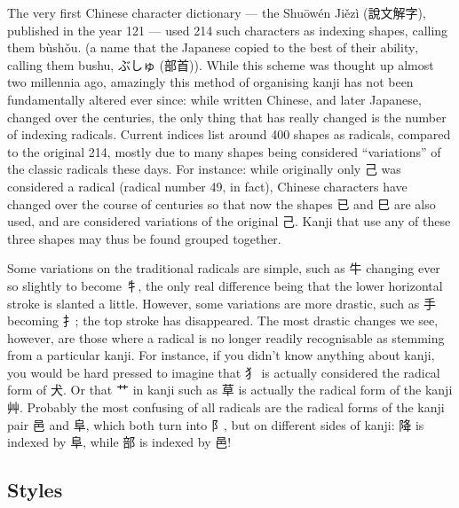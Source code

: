 \documentclass[11pt, b5paper, twoside, openright, onecolumn]{book}
\makeatletter
\newcommand*{\rubystack}[2]{{\relscale{0.5}%
  \begin{tabular}[b]{@{}c@{}}%
    {#1}\\%
   {\textscale{2}{#2}}%
  \end{tabular}}%
}
\DeclareRobustCommand*{\ruby}[2]{%
  \mbox{%
    \setlength{\parskip}{0ex}%
    \BeginAccSupp{method=pdfstringdef,ActualText={#1}}%
      \rubystack{\phantom{#2}}{#1}%
      \llap{%
        \rubystack{#2}{\phantom{#1}}%
      }%
    \EndAccSupp{}%
  }%
}
\renewcommand*{\ruby}[2]{#2 (#1)}%
\makeatother
\begin{document}
The very first Chinese character dictionary — the Shuōwén Jiězì (說文解字)‚ published in the year 121 — used 214 such characters as indexing shapes‚ calling them bùshǒu. (a name that the Japanese copied to the best of their ability‚ calling them bushu‚ \ruby{部首}{ぶしゅ}). While this scheme was thought up almost two millennia ago‚ amazingly this method of organising kanji has not been fundamentally altered ever since: while written Chinese‚ and later Japanese‚ changed over the centuries‚ the only thing that has really changed is the number of indexing radicals. Current indices list around 400 shapes as radicals‚ compared to the original 214‚ mostly due to many shapes being considered “variations” of the classic radicals these days. For instance: while originally only 己 was considered a radical (radical number 49‚ in fact)‚ Chinese characters have changed over the course of centuries so that now the shapes 已 and 巳 are also used‚ and are considered variations of the original 己. Kanji that use any of these three shapes may thus be found grouped together.

Some variations on the traditional radicals are simple‚ such as 牛 changing ever so slightly to become 牜‚ the only real difference being that the lower horizontal stroke is slanted a little. However‚ some variations are more drastic‚ such as 手 becoming 扌; the top stroke has disappeared. The most drastic changes we see‚ however‚ are those where a radical is no longer readily recognisable as stemming from a particular kanji. For instance‚ if you didn’t know anything about kanji‚ you would be hard pressed to imagine that 犭 is actually considered the radical form of 犬. Or that ⺾ in kanji such as 草 is actually the radical form of the kanji 艸. Probably the most confusing of all radicals are the radical forms of the kanji pair 邑 and 阜‚ which both turn into 阝‚ but on different sides of kanji: 降 is indexed by 阜‚ while 部 is indexed by 邑!
\subsection{Styles}
\end{document}
